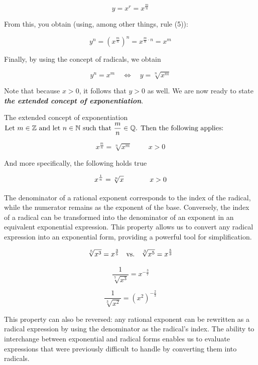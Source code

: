 \begin{equation*}
y=x^r=x^{\frac{m}{n}}
\end{equation*}

From this, you obtain (using, among other things, rule (5)):

\[
y^n = \left(x^{\frac{m}{n}}\right)^n = x^{\frac{m}{n} \cdot n} = x^m
\]

Finally, by using the concept of radicals, we obtain

\begin{equation*}
 y^n=x^m \quad \iff \quad y=\sqrt[n]{x^m}   
\end{equation*}

Note that because \(x > 0\), it follows that \(y > 0\) as well. We are now ready to state \textbf{\textit{the extended concept of exponentiation}}.

\begin{custombox}{The extended concept of exponentiation}
$\textnormal{Let } m \in \mathbb{Z} \textnormal{ and let }  n \in \mathbb{N} \textnormal{ such that } \dfrac{m}{n} \in \mathbb{Q}  \textnormal{. Then the following applies:}$

\[
x^{\frac{m}{n}} = \sqrt[n]{x^m} \hspace{1cm} x > 0
\]

\textnormal{And more specifically, the following holds true}

\[
x^{\frac{1}{n}} = \sqrt[n]{x} \hspace{1.3cm} x > 0
\]

\end{custombox}

The denominator of a rational exponent corresponds to the index of the radical, while the numerator remains as the exponent of the base. Conversely, the index of a radical can be transformed into the denominator of an exponent in an equivalent exponential expression. This property allows us to convert any radical expression into an exponential form, providing a powerful tool for simplification.

\begin{example}

\[
\sqrt[5]{x^3} = x^{\frac{3}{5}} \quad  \textnormal{vs.} \quad \sqrt[3]{x^5} = x^{\frac{5}{3}}
\]

\[
\frac{1}{\sqrt[7]{x^3}} = x^{-\frac{3}{7}}
\]

\[
\frac{1}{\sqrt[3]{x^2}} = \left(x^2\right)^{-\frac{2}{3}}
\]
\end{example}

This property can also be reversed: any rational exponent can be rewritten as a radical expression by using the denominator as the radical's index. The ability to interchange between exponential and radical forms enables us to evaluate expressions that were previously difficult to handle by converting them into radicals.

